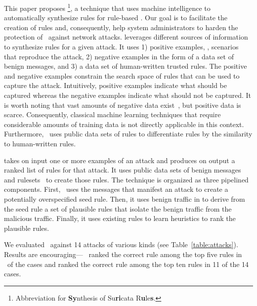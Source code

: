 \documentclass[sigconf,review, anonymous]{acmart}
\begin{document}
This paper proposes \tname{}\footnote{Abbreviation for
  \textbf{Sy}nthesis of Su\textbf{ri}cata R\textbf{u}le\textbf{s}.}, a
technique that uses machine intelligence to automatically synthesize
rules for rule-based \nids. Our goal is to facilitate the creation of
rules and, consequently, help system administrators to harden the
protection of \nids\ against network attacks.  \tname{} leverages
different sources of information to synthesize rules for a given
attack. It uses 1) positive examples, \ie{}, scenarios that reproduce
the attack, 2) negative examples in the form of a data set of benign
messages, and 3) a data set of human-written trusted rules. The
positive and negative examples constrain the search space of rules
that can be used to capture the attack. Intuitively, positive examples
indicate what should be captured whereas the negative examples
indicate what should not be captured. It is worth noting that vast
amounts of negative data exist~\cite{tcpreplay,stratosphere-normal},
but positive data is scarce. Consequently, classical machine learning
techniques that require considerable amounts of training data is not
directly applicable in this context. Furthermore, \tname\ uses public
data sets of rules to differentiate rules by the similarity to
human-written rules.

\tname{} takes on input one or more examples of an attack and produces
on output a ranked list of rules for that attack. It uses public data
sets of benign messages~\cite{tcpreplay,stratosphere-normal} and
rulesets~\cite{emerging-threats-open} to create those rules. The
technique is organized as three pipelined components. First,
\tname\ uses the messages that manifest an attack to create a
potentially overspecified seed rule. Then, it uses benign traffic in
to derive from the seed rule a set of plausible rules that isolate the
benign traffic from the malicious traffic. Finally, it uses existing
rules to learn heuristics to rank the plausible rules.

We evaluated \tname\ against 14 attacks of various kinds (see
Table~\ref{table:attacks}). Results are encouraging--- \tname\ ranked
the correct rule among the top five rules in \percTopFiveRanking\ of
the cases and ranked the correct rule among the top ten rules in 11 of
the 14 cases.

\end{document}
